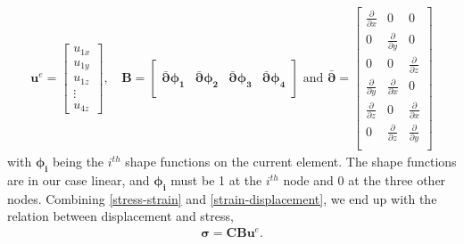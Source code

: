 \begin{align*}
\bm{u}^e = 
\begin{bmatrix}
u_{1x} \\
u_{1y} \\
u_{1z} \\
\vdots \\
u_{4z}
\end{bmatrix}, \,
&\bm{B} = 
\begin{bmatrix} \\
\bar{\bm{\partial}} \bm{\phi_1} & \bar{\bm{\partial}} \bm{\phi_2} & \bar{\bm{\partial}} \bm{\phi_3} & \bar{\bm{\partial}} \bm{\phi_4} \\[1em]
\end{bmatrix} \textrm{ and } 
\bar{\bm{\partial}} = 
\begin{bmatrix}
\frac{\partial}{\partial x} & 0 & 0 \\[0.3em]
0 & \frac{\partial}{\partial y} & 0 \\[0.3em]
0 & 0 & \frac{\partial}{\partial z} \\[0.3em]
\frac{\partial}{\partial y} & \frac{\partial}{\partial x} & 0 \\[0.3em]
\frac{\partial}{\partial z} & 0 & \frac{\partial}{\partial x}\\[0.3em]
0 & \frac{\partial}{\partial z} & \frac{\partial}{\partial y} \\
\end{bmatrix}
\end{align*}
with $\bm{\phi_i}$ being the $i^{th}$ shape functions on the current element. The shape functions are in our case linear, and $\bm{\phi_i}$ must be 1 at the $i^{th}$ node and 0 at the three other nodes. Combining \eqref{stress-strain} and \eqref{strain-displacement}, we end up with the relation between displacement and stress,
\begin{align}
\label{stress-displacement}
\bm{\sigma} = \bm{C} \bm{B} \bm{u}^e.
\end{align}











